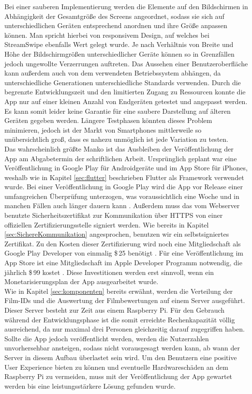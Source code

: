 \noindent
Bei einer sauberen Implementierung werden die Elemente auf den Bildschirmen in Abhängigkeit der Gesamtgröße des Screens angeordnet, sodass sie sich auf unterschiedlichen Geräten entsprechend anordnen und ihre Größe anpassen können. Man spricht hierbei von responsivem Design, auf welches bei StreamSwipe ebenfalls Wert gelegt wurde. Je nach Verhältnis von Breite und Höhe der Bildschirmgrößen unterschiedlicher Geräte können so in Grenzfällen jedoch ungewollte Verzerrungen auftreten. Das Aussehen einer Benutzeroberfläche kann außerdem auch von dem verwendeten Betriebssystem abhängen, da unterschiedliche Generationen unterschiedliche Standards verwenden. Durch die begrenzte Entwicklungszeit  und den limitierten Zugang zu Ressourcen konnte die App nur auf einer kleinen Anzahl von  Endgeräten getestet und angepasst werden. Es kann somit leider keine Garantie für eine saubere Darstellung auf älteren Geräten gegeben werden. Längere Testphasen könnten dieses Problem minimieren, jedoch ist der Markt von Smartphones mittlerweile so unübersichtlich groß, dass es nahezu unmöglich ist jede Variation zu testen.\\

\noindent
Das wahrscheinlich größte Manko ist das Ausbleiben der Veröffentlichung der App am Abgabetermin der schriftlichen Arbeit. Ursprünglich geplant war eine Veröffentlichung in Google Play für Androidgeräte und im App Store für iPhones, weshalb wie in Kapitel \ref{sec:flutter} beschrieben Flutter als Framework verwendet wurde. Bei einer Veröffentlichung in Google Play wird die App vor Release einer umfangreichen Überprüfung unterzogen, was voraussichtlich eine Woche und in manchen Fällen auch länger dauern kann \cite{playstore_release}. Außerdem muss das vom Webserver benutzte Sicherheitszertifikat zur Kommunikation über HTTPS von einer offiziellen Zertifizierungsstelle signiert werden. Wie bereits in Kapitel \ref{sec:SichereKommunikation} angesprochen, benutzen wir ein selbstsigniertes Zertifikat. Zu den Kosten dieser Zertifizierung wird noch eine Mitgliedschaft als Google Play Developer von einmalig \$\,25 benötigt \cite{kostenPlayStoreDeveloper}. Für eine  Veröffentlichung im App Store ist eine Mitgliedschaft im Apple Developer Programm notwendig, die jährlich \$\,99 kostet \cite{appstore_release}. Diese Investitionen werden erst sinnvoll, wenn ein Monetarisierungsplan der App ausgearbeitet wurde. \\

\noindent
Wie in Kapitel \ref{sec:komponenten} bereits erwähnt, werden die Verteilung der Film-IDs und die Auswertung der Filmbewertungen auf einem Server ausgeführt. Dieser Server besteht zur Zeit aus einem Raspberry Pi. Für den Gebrauch während der Entwicklungsphase ist die somit erreichte Rechenkapazität völlig ausreichend, da nur maximal drei Personen gleichzeitig darauf zugegriffen haben. Sollte die App jedoch veröffentlicht werden, werden die Nutzerzahlen unvorhersehbar ansteigen, sodass nicht vorausgesagt werden kann, ab wann der Server in diesem Aufbau überlastet sein wird. Um den Benutzern eine positive User Experience bieten zu können und eventuelle Hardwareschäden an dem Raspberry Pi zu vermeiden, muss mit der Veröffentlichung der App gewartet werden bis eine leistungsstärkere Lösung gefunden wurde.